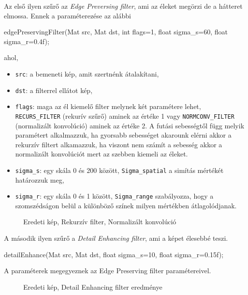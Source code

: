 Az első ilyen szűrő az \textit{Edge Preversing filter}, ami az éleket megörzi de a hátteret elmossa. 
Ennek a paraméterezése az alábbi
\begin{cpp}
edgePreservingFilter(Mat src, Mat dst, int flags=1, 
			float sigma_s=60, float sigma_r=0.4f);
\end{cpp}
ahol,
\begin{itemize}
    \item \texttt{src}: a bemeneti kép, amit szertnénk átalakítani,
    \item \texttt{dst}: a filterrel ellátot kép,
    \item \texttt{flags}: maga az él kiemelő filter melynek két paramétere lehet, \texttt{RECURS\_FILTER} (rekurív szűrő) aminek az értéke 1 vagy \texttt{NORMCONV\_FILTER} (normalizált konvolúció) aminek az értéke 2.  A futási sebességtől függ melyik paramétert alkalmazzuk, ha gyorsabb sebességet akarounk elérni akkor a rekurzív filtert alkamazzuk, ha viszont nem számít a sebesség akkor a  normalizált konvolúciót mert az szebben kiemeli az éleket.
    \item \texttt{sigma\_s}: egy skála 0 és 200 között, \texttt{Sigma\_spatial} a simítás mértékét határozzuk meg,
    \item \texttt{sigma\_r}: egy skála 0 és 1 között, \texttt{Sigma\_range} szabályozza, hogy a szomszédságon belül a különböző színek milyen mértékben átlagolódjanak.
\end{itemize}

\begin{figure}[ht]
\centering
{}
\caption{Eredeti kép, Rekurzív filter, Normalizált konvolúció} 
\label{fig:edgePreservingFilter}
\end{figure}


A második ilyen szűrő a \textit{Detail Enhancing filter}, ami a képet élesebbé teszi.
\begin{cpp}
detailEnhance(Mat src, Mat dst, float sigma_s=10, float sigma_r=0.15f);
\end{cpp}
A paraméterek megegyeznek az Edge Preserving filter paramétereivel. 

\begin{figure}[ht]
\centering
{}
\caption{Eredeti kép, Detail Enhancing filter eredménye} 
\label{fig:detailEnhance}
\end{figure}

